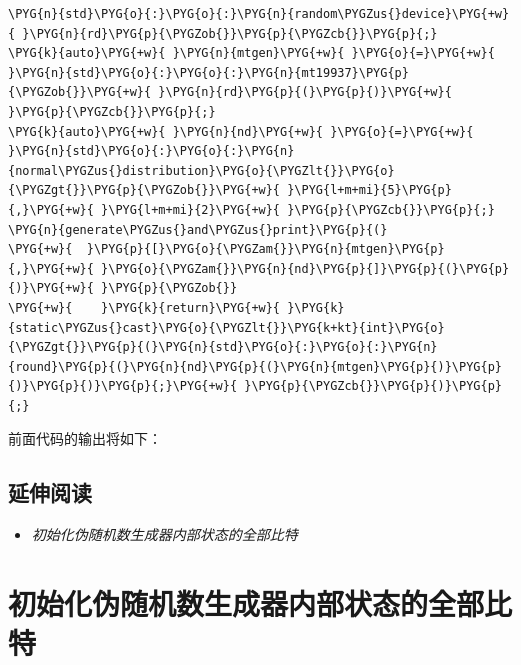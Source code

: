 \begin{codeblockbg}
\begin{Verbatim}[commandchars=\\\{\},breaklines=true,breakanywhere=true,fontsize=\codefont,xleftmargin=17bp]
\PYG{n}{std}\PYG{o}{:}\PYG{o}{:}\PYG{n}{random\PYGZus{}device}\PYG{+w}{ }\PYG{n}{rd}\PYG{p}{\PYGZob{}}\PYG{p}{\PYGZcb{}}\PYG{p}{;}
\PYG{k}{auto}\PYG{+w}{ }\PYG{n}{mtgen}\PYG{+w}{ }\PYG{o}{=}\PYG{+w}{ }\PYG{n}{std}\PYG{o}{:}\PYG{o}{:}\PYG{n}{mt19937}\PYG{p}{\PYGZob{}}\PYG{+w}{ }\PYG{n}{rd}\PYG{p}{(}\PYG{p}{)}\PYG{+w}{ }\PYG{p}{\PYGZcb{}}\PYG{p}{;}
\PYG{k}{auto}\PYG{+w}{ }\PYG{n}{nd}\PYG{+w}{ }\PYG{o}{=}\PYG{+w}{ }\PYG{n}{std}\PYG{o}{:}\PYG{o}{:}\PYG{n}{normal\PYGZus{}distribution}\PYG{o}{\PYGZlt{}}\PYG{o}{\PYGZgt{}}\PYG{p}{\PYGZob{}}\PYG{+w}{ }\PYG{l+m+mi}{5}\PYG{p}{,}\PYG{+w}{ }\PYG{l+m+mi}{2}\PYG{+w}{ }\PYG{p}{\PYGZcb{}}\PYG{p}{;}
\PYG{n}{generate\PYGZus{}and\PYGZus{}print}\PYG{p}{(}
\PYG{+w}{  }\PYG{p}{[}\PYG{o}{\PYGZam{}}\PYG{n}{mtgen}\PYG{p}{,}\PYG{+w}{ }\PYG{o}{\PYGZam{}}\PYG{n}{nd}\PYG{p}{]}\PYG{p}{(}\PYG{p}{)}\PYG{+w}{ }\PYG{p}{\PYGZob{}}
\PYG{+w}{    }\PYG{k}{return}\PYG{+w}{ }\PYG{k}{static\PYGZus{}cast}\PYG{o}{\PYGZlt{}}\PYG{k+kt}{int}\PYG{o}{\PYGZgt{}}\PYG{p}{(}\PYG{n}{std}\PYG{o}{:}\PYG{o}{:}\PYG{n}{round}\PYG{p}{(}\PYG{n}{nd}\PYG{p}{(}\PYG{n}{mtgen}\PYG{p}{)}\PYG{p}{)}\PYG{p}{)}\PYG{p}{;}\PYG{+w}{ }\PYG{p}{\PYGZcb{}}\PYG{p}{)}\PYG{p}{;}
\end{Verbatim}
\end{codeblockbg}



前面代码的输出将如下：






\subsection{延伸阅读}



\begin{itemize}
\item \textit{初始化伪随机数生成器内部状态的全部比特}

\end{itemize}



\section{初始化伪随机数生成器内部状态的全部比特}


